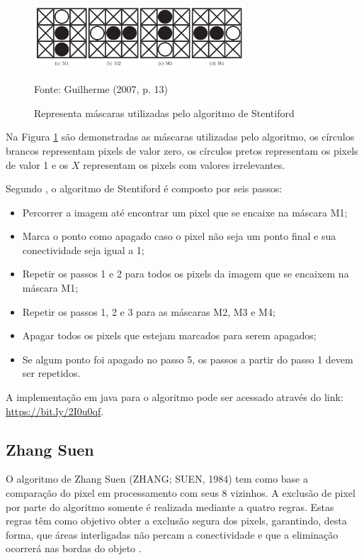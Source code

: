 \documentclass[
	12pt,				%
	oneside,			%
	a4paper,			%
	english,			%
	french,				%
	spanish,			%
	brazil,				%
	]{abntex2}
\begin{document}
\begin{figure}[ht]
\centering
\caption{Representa máscaras utilizadas pelo algoritmo de Stentiford}
\includegraphics[width=0.7\textwidth]{imagens/stentiford.png}

Fonte: Guilherme (2007, p. 13)
\label{fig:stentiford}
\end{figure}

Na Figura \ref{fig:stentiford} são demonstradas as máscaras utilizadas pelo algoritmo, os círculos brancos representam pixels de valor zero, os círculos pretos representam os pixels de valor 1 e os \(X\) representam os pixels com valores irrelevantes.

Segundo \citet{guilherme:2007}, o algoritmo de Stentiford é composto por seis passos:

\begin{itemize}
\item Percorrer a imagem até encontrar um pixel que se encaixe na máscara M1;
\item Marca o ponto como apagado caso o pixel não seja um ponto final e sua conectividade seja igual a 1;
\item Repetir os passos 1 e 2 para todos os pixels da imagem que se encaixem na máscara M1;
\item Repetir os passos 1, 2 e 3 para as máscaras M2, M3 e M4;
\item Apagar todos os pixels que estejam marcados para serem apagados;
\item Se algum ponto foi apagado no passo 5, os passos a partir do passo 1 devem ser repetidos.
\end{itemize}

A implementação em java para o algoritmo pode ser acessado através do link: \url{https://bit.ly/2I0u0qf}.

\subsection{Zhang Suen}

O algoritmo de Zhang Suen (ZHANG; SUEN, 1984) tem como base a comparação do pixel em processamento com seus 8 vizinhos. A exclusão de pixel por parte do algoritmo somente é realizada mediante a quatro regras. Estas regras têm como objetivo obter a exclusão segura dos pixels, garantindo, desta forma, que áreas interligadas não percam a conectividade e que a eliminação ocorrerá nas bordas do objeto \cite{guilherme:2007}.
\end{document}
